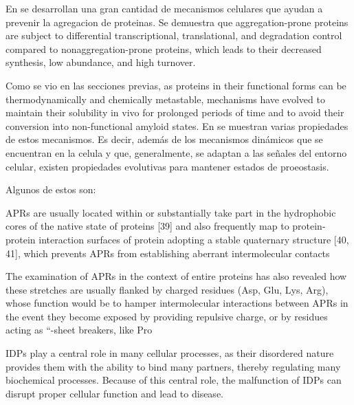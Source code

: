 


En \cite{gsponer2012cellular} se desarrollan una gran cantidad de mecanismos celulares que ayudan a prevenir la agregacion de proteinas. 
Se demuestra que aggregation-prone proteins are subject to differential transcriptional, translational, and degradation control compared to nonaggregation-prone proteins, which leads to their decreased
synthesis, low abundance, and high turnover. 


Como se vio en las secciones previas, as proteins in their functional forms can be thermodynamically and chemically metastable, mechanisms have evolved to maintain their solubility in vivo for prolonged periods of
time and to avoid their conversion into non-functional amyloid states.
En \cite{knowles2014amyloid} se muestran varias propiedades de estos mecanismos. 
Es decir, además de los mecanismos dinámicos que se encuentran en la celula y que, generalmente, se adaptan a las señales del entorno celular, existen propiedades evolutivas para mantener estados de proeostasis.

Algunos de estos son:

APRs are usually located within or
substantially take part in the hydrophobic cores of the native state of proteins [39]
and also frequently map to protein-protein interaction surfaces of protein adopting
a stable quaternary structure [40, 41], which prevents APRs from establishing
aberrant intermolecular contacts

The examination of APRs in the context of entire proteins has also revealed how
these stretches are usually flanked by charged residues (Asp, Glu, Lys, Arg), whose
function would be to hamper intermolecular interactions between APRs in the event
they become exposed by providing repulsive charge, or by residues acting as “-sheet
breakers, like Pro


IDPs play a central role in many cellular processes, as their disordered nature provides them with the ability to bind many partners, thereby regulating many biochemical
processes. Because of this central role, the malfunction of IDPs can disrupt proper cellular function and lead to disease.

